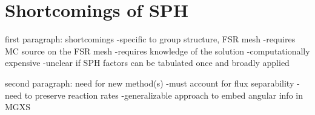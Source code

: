 

\section{Shortcomings of SPH}
\label{subsec:chap5-sph-shortcomings}

first paragraph: shortcomings
-specific to group structure, FSR mesh
-requires MC source on the FSR mesh
  -requires knowledge of the solution
-computationally expensive
-unclear if SPH factors can be tabulated once and broadly applied

second paragraph: need for new method(s)
-must account for flux separability
-need to preserve reaction rates
-generalizable approach to embed angular info in MGXS